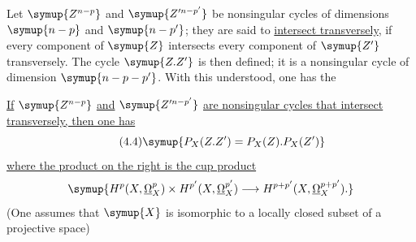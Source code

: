 Let $\symup{Z^{n-p}}$ and $\symup{Z'^{n-p'}}$ be nonsingular cycles of dimensions $\symup{n-p}$ and
$\symup{n-p'}$; they are said to \uline{intersect transversely}, if every component of
$\symup{Z}$ intersects every component of $\symup{Z'}$ transversely. The cycle $\symup{Z.Z'}$ is then
defined; it is a nonsingular cycle of dimension $\symup{n-p-p'}$. With this understood,
one has the

 \uline{If} $\symup{Z^{n-p}}$ \uline{and} $\symup{Z'^{n-p'}}$ \uline{are nonsingular cycles that
intersect transversely, then one has}
\begin{equation}\tag{4.4}
  \symup{P_X(Z.Z')=P_X(Z).P_X(Z')}
\end{equation}
\uline{where the product on the right is the cup product}
\[
  \symup{H^{p}(X,\underline{\Omega}_X^{p})\times H^{p'}(X,\underline{\Omega}_X^{p'})
  \longrightarrow H^{p+p'}(X,\underline{\Omega}_X^{p+p'}).}
\]
(One assumes that $\symup{X}$ is isomorphic to a locally closed subset of a projective
space)

